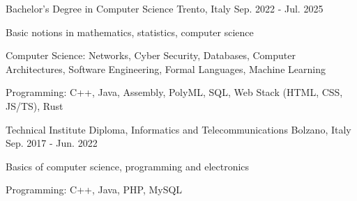 
\begin{cventries}
   {Bachelor's Degree in Computer Science}
  {Trento, Italy} {Sep. 2022 - Jul. 2025} %
  { \begin{cvitems} %
  \item {Basic notions in mathematics, statistics, computer science} \item {Computer Science: Networks, Cyber Security, Databases, Computer Architectures, Software Engineering, Formal Languages, Machine Learning} \item {Programming: C++, Java, Assembly, PolyML, SQL, Web Stack (HTML, CSS, JS/TS), Rust}\end{cvitems} }

  {Technical Institute Diploma, Informatics and Telecommunications} %
  {Bolzano, Italy} %
  {Sep. 2017 - Jun. 2022} %
  { \begin{cvitems} %
  \item {Basics of computer science, programming and electronics} \item {Programming: C++, Java, PHP, MySQL}\end{cvitems} }

\end{cventries}